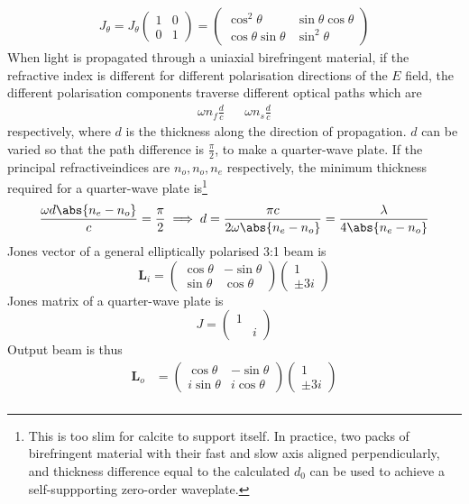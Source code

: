 \documentclass[12pt]{extarticle}
\renewcommand{\bf}{\mathbf}
\begin{document}
\begin{outline}[enumerate]
{\begin{gather*}
            J_\theta =J_\theta \begin{pmatrix} 1&0\\0&1 \end{pmatrix} = \begin{pmatrix}  \cos^2\theta &\sin\theta \cos \theta \\ \cos \theta \sin\theta & \sin^2 \theta \end{pmatrix}
        \end{gather*}}
        \1 When light is propagated through a uniaxial birefringent material, if the refractive index is different for different polarisation directions of the \(E\) field, the different polarisation components traverse different optical paths which are \begin{align*}
            \omega n_f \frac{d}{c} && \omega n_s \frac{d}{c}
        \end{align*} 
        respectively, where \(d\) is the thickness along the direction of propagation. \(d\) can be varied so that the path difference is \(\frac{\pi}{2}\), to make a quarter-wave plate. If the principal refractiveindices are \(n_o,n_o,n_e\) respectively, the minimum thickness required for a quarter-wave plate is\footnote{This is too slim for calcite to support itself. In practice, two packs of birefringent material with their fast and slow axis aligned perpendicularly, and thickness difference equal to the calculated \(d_0\) can be used to achieve a self-suppporting zero-order waveplate.} \[
            \frac{\omega d\abs{n_e - n_o}}{c} = \frac{\pi}{2} \implies d = \frac{\pi c}{2\omega \abs{n_e - n_o}}= \frac{ \lambda}{4 \abs{n_e - n_o}}
        \]
        \1 Jones vector of a general elliptically polarised 3:1 beam is \[
            \bf L_i = \begin{pmatrix} \cos\theta &- \sin\theta \\ \sin \theta &\cos \theta  \end{pmatrix} \begin{pmatrix} 1\\ \pm 3i \end{pmatrix} 
        \] Jones matrix of a quarter-wave plate is \[
            J = \begin{pmatrix} 1&\\ &i \end{pmatrix} 
        \]
        Output beam is thus \begin{align*}
            \bf L_o &=  \begin{pmatrix} \cos\theta &- \sin\theta \\ i\sin \theta &i\cos \theta  \end{pmatrix} \begin{pmatrix} 1\\ \pm 3i \end{pmatrix}\\

\end{align*}
\end{outline}
\end{document}
